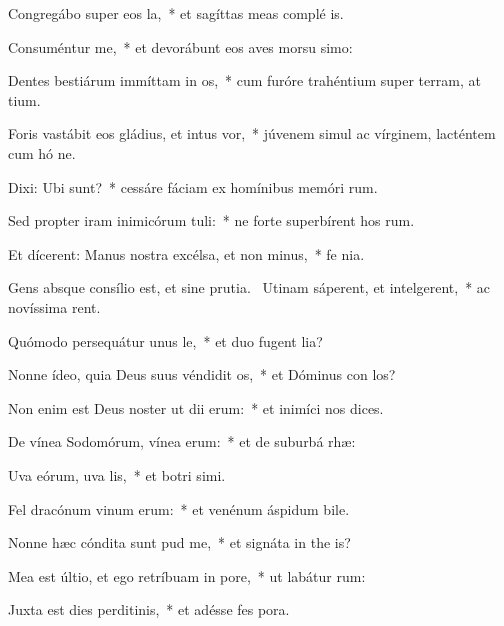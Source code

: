\item Congregábo super eos la,~* et sagíttas meas complé  is.
\item Consuméntur me,~* et devorábunt eos aves morsu simo:
\item Dentes bestiárum immíttam in os,~* cum furóre trahéntium super terram, at tium.
\item Foris vastábit eos gládius, et intus vor,~* júvenem simul ac vírginem, lacténtem cum hó ne.
\item Dixi: Ubi sunt?~* cessáre fáciam ex homínibus memóri rum.
\item Sed propter iram inimicórum tuli:~* ne forte superbírent hos rum.
\item Et dícerent: Manus nostra excélsa, et non minus,~* fe  nia.
\item Gens absque consílio est, et sine prutia.~\pscross{} Utinam sáperent, et intelgerent,~* ac novíssima rent.
\item Quómodo persequátur unus le,~* et duo fugent  lia?
\item Nonne ídeo, quia Deus suus véndidit os,~* et Dóminus con los?
\item Non enim est Deus noster ut dii erum:~* et inimíci nos  dices.
\item De vínea Sodomórum, vínea erum:~* et de suburbá rhæ:
\item Uva eórum, uva lis,~* et botri simi.
\item Fel dracónum vinum erum:~* et venénum áspidum bile.
\item Nonne hæc cóndita sunt pud me,~* et signáta in the is?
\item Mea est últio, et ego retríbuam in pore,~* ut labátur  rum:
\item Juxta est dies perditinis,~* et adésse fes pora.
